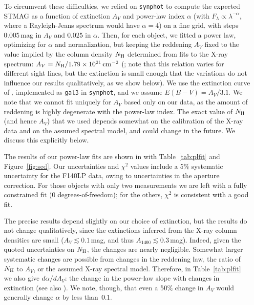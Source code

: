 \documentclass[iop]{emulateapj}
\newcommand{\expnt}[2]{\ensuremath{#1 \times 10^{#2}}}   %
\begin{document}
To circumvent these difficulties, we relied on \texttt{synphot} to
compute the expected STMAG as a function of extinction $A_V$ and
power-law index $\alpha$ (with $F_\lambda \propto \lambda^{-\alpha}$,
where a Rayleigh-Jeans spectrum would have $\alpha=4$) on a fine grid,
with steps 0.005\,mag in $A_V$ and 0.025 in $\alpha$.  Then, for each
object, we fitted a power law, optimizing for $\alpha$ and
normalization, but keeping the reddening $A_V$ fixed to the value
implied by the column density $N_{\rm H}$ determined from fits to the
X-ray spectrum: $A_V=N_{\rm H}/\expnt{1.79}{21}\,{\rm cm}^{-2}$
(\citealt{ps95}; note that this relation varies for different sight
lines, but the extinction is small enough that the variations do not
influence our results qualitatively, as we show below).  We use the
extinction curve of \citet*{ccm89}, implemented as \texttt{gal3} in
\texttt{synphot}, and we assume $E(B-V)=A_V/3.1$.  We note that we
cannot fit uniquely for $A_V$ based only on our data, as the amount of
reddening is highly degenerate with the power-law index.  The exact
value of $N_{\rm H}$ (and hence $A_V$) that we used depends somewhat
on the calibration of the X-ray data and on the assumed spectral
model, and could change in the future.  We discuss this explicitly
below.

The results of our power-law fits are shown in with
Table~\ref{tab:plfit} and Figure~\ref{fig:sed}.  Our uncertainties and
$\chi^2$ values include a 5\% systematic uncertainty for the F140LP
data, owing to uncertainties in the aperture correction.  For those
objects with only two measurements we are left with a fully
constrained fit (0 degrees-of-freedom); for the others, $\chi^2$ is
consistent with a good fit.  


The precise results depend slightly on our choice of extinction, but
the results do not change qualitatively, since the extinctions
inferred from the X-ray column densities are small ($A_V\lesssim
0.1\,$mag, and thus $A_{1400}\lesssim0.3\,$mag).  Indeed, given the
quoted uncertainties on $N_{\rm H}$, the changes are nearly
negligible.  Somewhat larger systematic changes are possible from
changes in the reddening law, the ratio of $N_{\rm H}$ to $A_V$, or
the assumed X-ray spectral model.  Therefore, in Table~\ref{tab:plfit}
we also give $d\alpha/dA_V$: the change in the power-law slope with
changes in extinction (see also \citealt{vkk01}).  We note, though,
that even a 50\% change in $A_V$ would generally change $\alpha$ by
less than~0.1.
\end{document}

